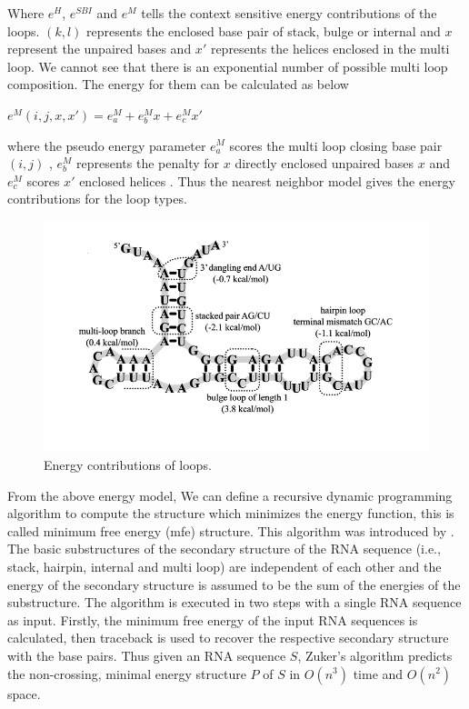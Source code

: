 \documentclass[twoside,a4paper]{report}
\begin{document}
 	 Where $e^H$, $e^{SBI}$ and $e^M$ tells the context sensitive energy contributions of the loops. $(k,l)$ represents the enclosed base pair of stack, bulge or internal and $x$ represent the unpaired bases and $x'$ represents the helices enclosed in the multi loop. We cannot see that there is an exponential number of possible multi loop composition. The energy for them can be calculated as below \\
 	 \begin{center}
 	 $e^M(i,j,x,x')= e^M_a+e^M_bx+e^M_cx'$\\
 	\end{center}
 	 where the pseudo energy parameter $e^M_a$ scores the multi loop closing base pair $(i,j)$ , $e^M_b$ represents the penalty for $x$ directly enclosed unpaired bases $x$ and $e^M_c$ scores $x'$ enclosed helices .
 	 Thus the nearest neighbor model gives the energy contributions for the loop types. \\
 	 
 	 \begin{figure}[h]
 	 	\includegraphics[width=0.9\linewidth]{energy}
 	 	\centering
 	 	\caption{Energy contributions of loops. \citep{andronescu2010computational}}
 	 	\label{fig:energycontribution}
 	 \end{figure}
 	 
 	 
 	 From the above energy model, We can define a recursive dynamic programming algorithm to compute the structure which minimizes the energy function, this is called minimum free energy (mfe) structure. This algorithm was introduced by \citet{zuker1981optimal}.\\
 	 
 	 The basic substructures of the secondary structure of the RNA sequence (i.e., stack, hairpin, internal and multi loop) are independent of each other and the energy of the secondary structure is assumed to be the sum of the energies of the substructure. The algorithm is executed in two steps with a single RNA sequence as input. Firstly, the minimum free energy of the input RNA sequences is calculated, then traceback is used to recover the respective secondary structure with the base pairs. Thus given an RNA sequence $S$, Zuker’s algorithm predicts the non-crossing, minimal energy structure $P$ of $S$ in $O(n^3)$ time and $O(n^2)$ space.\\
 	 
\end{document}
